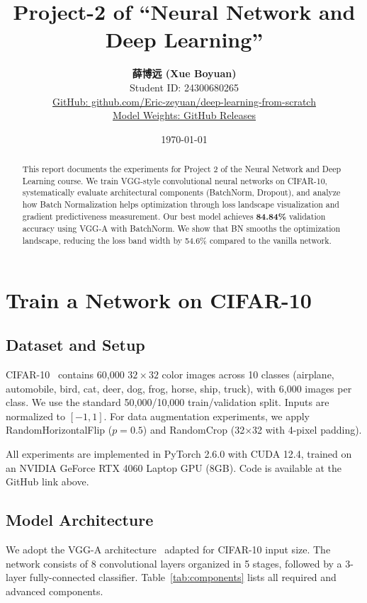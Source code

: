 \documentclass[11pt,a4paper]{article}
\title{Project-2 of ``Neural Network and Deep Learning''}
\author{
    \textbf{薛博远 (Xue Boyuan)} \\[2pt]
    \small Student ID: 24300680265 \\
    \small \href{https://github.com/Eric-zeyuan/deep-learning-from-scratch}{GitHub: github.com/Eric-zeyuan/deep-learning-from-scratch} \\
    \small \href{https://github.com/Eric-zeyuan/deep-learning-from-scratch/releases/tag/v1.0}{Model Weights: GitHub Releases}
}
\date{\today}
\begin{document}
\maketitle

\begin{abstract}
This report documents the experiments for Project 2 of the Neural Network and Deep Learning course.
We train VGG-style convolutional neural networks on CIFAR-10, systematically evaluate architectural
components (BatchNorm, Dropout), and analyze how Batch Normalization helps optimization through
loss landscape visualization and gradient predictiveness measurement. Our best model achieves
\textbf{84.84\%} validation accuracy using VGG-A with BatchNorm. We show that BN smooths the
optimization landscape, reducing the loss band width by 54.6\% compared to the vanilla network.
\end{abstract}

\section{Train a Network on CIFAR-10}

\subsection{Dataset and Setup}

CIFAR-10~\cite{krizhevsky2009learning} contains 60,000 $32\times32$ color images across 10 classes
(airplane, automobile, bird, cat, deer, dog, frog, horse, ship, truck), with 6,000 images per class.
We use the standard 50,000/10,000 train/validation split. Inputs are normalized to $[-1, 1]$.
For data augmentation experiments, we apply RandomHorizontalFlip ($p=0.5$) and RandomCrop
(32$\times$32 with 4-pixel padding).

All experiments are implemented in PyTorch 2.6.0 with CUDA 12.4, trained on an
NVIDIA GeForce RTX 4060 Laptop GPU (8GB). Code is available at the GitHub link above.

\subsection{Model Architecture}

We adopt the VGG-A architecture~\cite{simonyan2014very} adapted for CIFAR-10 input size.
The network consists of 8 convolutional layers organized in 5 stages, followed by a
3-layer fully-connected classifier. Table~\ref{tab:components} lists all required and
advanced components.
\end{document}
